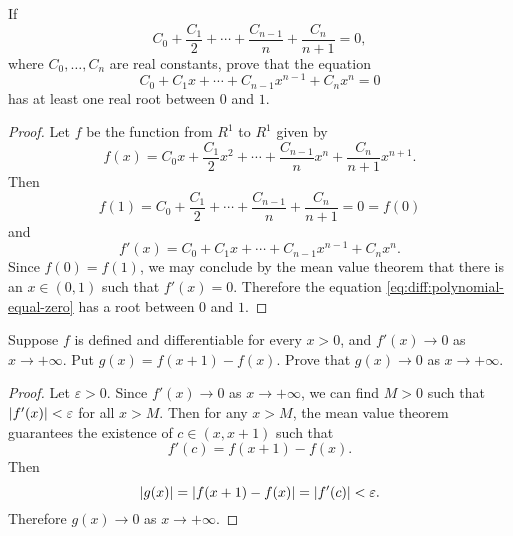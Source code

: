  If
\begin{equation*}
  C_0 + \frac{C_1}2 + \cdots + \frac{C_{n-1}}n + \frac{C_n}{n+1} = 0,
\end{equation*}
where $C_0,\dots,C_n$ are real constants, prove that the equation
\begin{equation}
  \label{eq:diff:polynomial-equal-zero}
  C_0 + C_1x + \cdots + C_{n-1}x^{n-1} + C_nx^n = 0
\end{equation}
has at least one real root between $0$ and $1$.
\begin{proof}
  Let $f$ be the function from $R^1$ to $R^1$ given by
  \begin{equation*}
    f(x) = C_0x + \frac{C_1}2x^2 + \cdots
    + \frac{C_{n-1}}nx^n + \frac{C_n}{n+1}x^{n+1}.
  \end{equation*}
  Then
  \begin{equation*}
    f(1) = C_0 + \frac{C_1}2 + \cdots
    + \frac{C_{n-1}}n + \frac{C_n}{n+1} = 0 = f(0)
  \end{equation*}
  and
  \begin{equation*}
    f'(x) = C_0 + C_1x + \cdots + C_{n-1}x^{n-1} + C_nx^n.
  \end{equation*}
  Since $f(0) = f(1)$, we may conclude by the mean value theorem that
  there is an $x\in(0,1)$ such that $f'(x) = 0$. Therefore the
  equation \eqref{eq:diff:polynomial-equal-zero} has a root between
  $0$ and $1$.
\end{proof}

 Suppose $f$ is defined and differentiable for every
$x > 0$, and $f'(x)\to0$ as $x\to+\infty$. Put $g(x) = f(x+1) -
f(x)$. Prove that $g(x)\to0$ as $x\to+\infty$.
\begin{proof}
  Let $\varepsilon > 0$. Since $f'(x)\to0$ as $x\to+\infty$, we can
  find $M > 0$ such that $\lvert{f'(x)}\rvert < \varepsilon$ for all $x >
  M$. Then for any $x > M$, the mean value theorem guarantees the
  existence of $c\in(x,x+1)$ such that
  \begin{equation*}
    f'(c) = f(x+1) - f(x).
  \end{equation*}
  Then
  \begin{equation*}
    \lvert{g(x)}\rvert = \lvert{f(x+1) - f(x)}\rvert
    = \lvert{f'(c)}\rvert < \varepsilon.
  \end{equation*}
  Therefore $g(x)\to0$ as $x\to+\infty$.
\end{proof}

